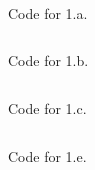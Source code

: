 \documentclass[11pt, oneside]{article}   	%
\begin{document}
 \\\\\\
 \begin{center}
 Code for 1.a.\\
\end{center}
\inputminted[linenos,fontsize=\scriptsize]{python}{q1a.py}
\begin{center}
 Code for 1.b.\\
\end{center}
\inputminted[linenos,fontsize=\scriptsize]{python}{q1b.py}
\begin{center}
 Code for 1.c.\\
\end{center}
\inputminted[linenos,fontsize=\scriptsize]{python}{q1c.py}
\begin{center}
 Code for 1.e.\\
\end{center}
\inputminted[linenos,fontsize=\scriptsize]{python}{q1e.py}
\end{document}
